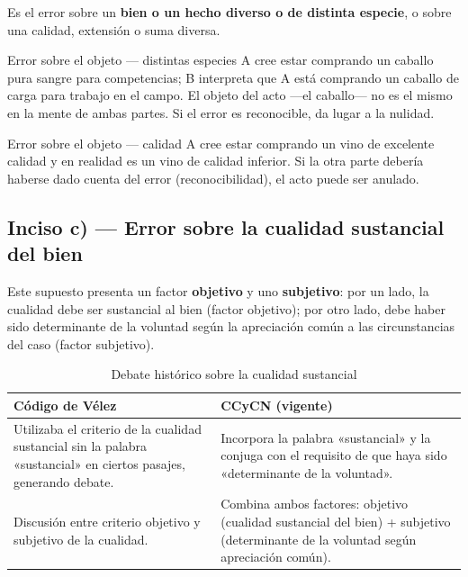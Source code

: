 \documentclass[12pt,oneside]{book}
\begin{document}
Es el error sobre un \textbf{bien o un hecho diverso o de distinta especie}, o sobre una calidad, extensión o suma diversa.

\begin{example}{Error sobre el objeto --- distintas especies}
A cree estar comprando un caballo pura sangre para competencias; B interpreta que A está comprando un caballo de carga para trabajo en el campo. El objeto del acto ---el caballo--- no es el mismo en la mente de ambas partes. Si el error es reconocible, da lugar a la nulidad.
\end{example}

\begin{example}{Error sobre el objeto --- calidad}
A cree estar comprando un vino de excelente calidad y en realidad es un vino de calidad inferior. Si la otra parte debería haberse dado cuenta del error (reconocibilidad), el acto puede ser anulado.
\end{example}

\subsection{Inciso c) --- Error sobre la cualidad sustancial del bien}

Este supuesto presenta un factor \textbf{objetivo} y uno \textbf{subjetivo}: por un lado, la cualidad debe ser sustancial al bien (factor objetivo); por otro lado, debe haber sido determinante de la voluntad según la apreciación común a las circunstancias del caso (factor subjetivo).

\begin{table}[H]
\centering
\begin{tabularx}{\textwidth}{>{\raggedright\arraybackslash}X >{\raggedright\arraybackslash}X}
\toprule
\textbf{Código de Vélez} & \textbf{CCyCN (vigente)} \\
\midrule
Utilizaba el criterio de la cualidad sustancial sin la palabra «sustancial» en ciertos pasajes, generando debate. & Incorpora la palabra «sustancial» y la conjuga con el requisito de que haya sido «determinante de la voluntad». \\[4pt]
Discusión entre criterio objetivo y subjetivo de la cualidad. & Combina ambos factores: objetivo (cualidad sustancial del bien) + subjetivo (determinante de la voluntad según apreciación común). \\
\bottomrule
\end{tabularx}
\caption{Debate histórico sobre la cualidad sustancial}
\end{table}
\end{document}
